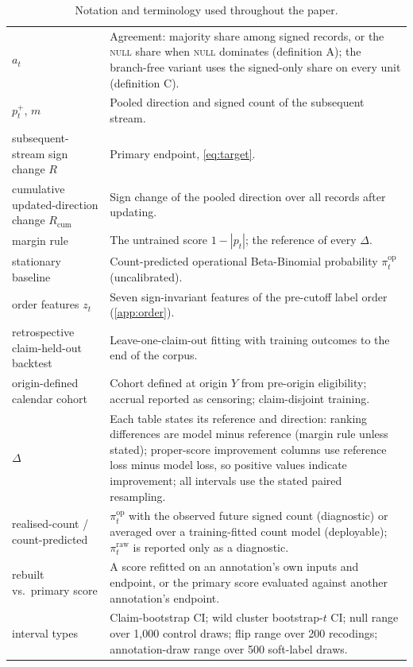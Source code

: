 \documentclass[11pt]{article}
\begin{document}
\begin{table}[!t]
\begin{tabular}{@{}p{}p{}@{}}
$a_t$ & Agreement: majority share among signed records, or the \textsc{null} share when \textsc{null} dominates (definition A); the branch-free variant uses the signed-only share on every unit (definition C). \\
$p^{+}_t$, $m$ & Pooled direction and signed count of the subsequent stream. \\
subsequent-stream sign change $R$ & Primary endpoint, \cref{eq:target}. \\
cumulative updated-direction change $R_{\mathrm{cum}}$ & Sign change of the pooled direction over all records after updating. \\
margin rule & The untrained score $1-|p_t|$; the reference of every $\Delta$. \\
stationary baseline & Count-predicted operational Beta-Binomial probability $\pi^{\mathrm{op}}_t$ (uncalibrated). \\
order features $z_t$ & Seven sign-invariant features of the pre-cutoff label order (\cref{app:order}). \\
retrospective claim-held-out backtest & Leave-one-claim-out fitting with training outcomes to the end of the corpus. \\
origin-defined calendar cohort & Cohort defined at origin $Y$ from pre-origin eligibility; accrual reported as censoring; claim-disjoint training. \\
$\Delta$ & Each table states its reference and direction: ranking differences are model minus reference (margin rule unless stated); proper-score improvement columns use reference loss minus model loss, so positive values indicate improvement; all intervals use the stated paired resampling. \\
realised-count / count-predicted & $\pi^{\mathrm{op}}_t$ with the observed future signed count (diagnostic) or averaged over a training-fitted count model (deployable); $\pi^{\mathrm{raw}}_t$ is reported only as a diagnostic. \\
rebuilt vs.\ primary score & A score refitted on an annotation's own inputs and endpoint, or the primary score evaluated against another annotation's endpoint. \\
interval types & Claim-bootstrap CI; wild cluster bootstrap-$t$ CI; null range over 1{,}000 control draws; flip range over 200 recodings; annotation-draw range over 500 soft-label draws. \\
\bottomrule
\end{tabular}
\caption{Notation and terminology used throughout the paper.}
\label{tab:notation}
\end{table}
\end{document}
